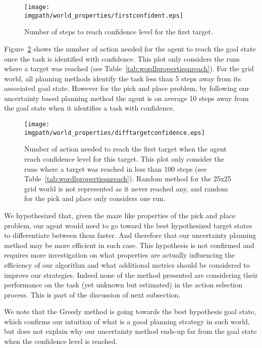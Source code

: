 \begin{figure}[!ht]
\centering
\texttt{[image: \\imgpath/world\_properties/firstconfident.eps]}
\caption{Number of steps to reach confidence level for the first target.}
\label{fig:wordlpropertiesconfidencefirst}
\end{figure} 

Figure~\ref{fig:wordlpropertiestargetdist} shows the number of action needed for the agent to reach the goal state once the task is identified with confidence. This plot only considers the runs where a target was reached (see Table~\ref{tab:wordlpropertiesnreach}). For the grid world, all planning methods identify the task less than 5 steps away from its associated goal state. However for the pick and place problem, by following our uncertainty based planning method the agent is on average 10 steps away from the goal state when it identifies a task with confidence.

\begin{figure}[!ht]
\centering
\texttt{[image: \\imgpath/world\_properties/difftargetconfidence.eps]}
\caption{Number of action needed to reach the first target when the agent reach confidence level for this target. This plot only consider the runs where a target was reached in less than 100 steps (see Table~\ref{tab:wordlpropertiesnreach}). Random method for the 25x25 grid world is not represented as it never reached any, and random for the pick and place only considers one run.}
\label{fig:wordlpropertiestargetdist}
\end{figure} 

We hypothesized that, given the maze like properties of the pick and place problem, our agent would need to go toward the best hypothesized target states to differentiate between them faster. And therefore that our uncertainty planning method may be more efficient in such case. This hypothesis is not confirmed and requires more investigation on what properties are actually influencing the efficiency of our algorithm and what additional metrics should be considered to improve our strategies. Indeed none of the method presented are considering their performance on the task (yet unknown but estimated) in the action selection process. This is part of the discussion of next subsection.

We note that the Greedy method is going towards the best hypothesis goal state, which confirms our intuition of what is a good planning strategy in such world, but does not explain why our uncertainty method ends-up far from the goal state when the confidence level is reached.

